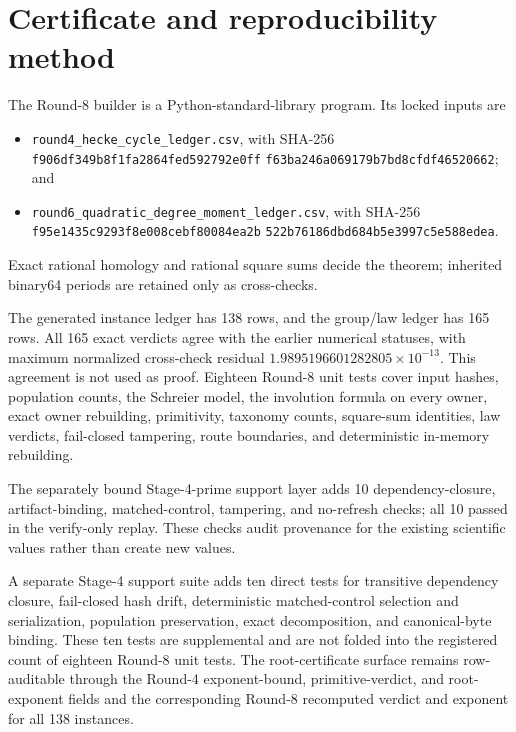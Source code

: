 \documentclass[11pt]{article}
\theoremstyle{definition}
\theoremstyle{remark}
\begin{document}
\section{Certificate and reproducibility method}\label{sec:repro}

The Round-8 builder is a Python-standard-library program. Its locked inputs are
\begin{itemize}
\item \texttt{round4\_hecke\_cycle\_ledger.csv}, with
\newline SHA-256
\texttt{f906df349b8f1fa2864fed592792e0ff}\newline
\texttt{f63ba246a069179b7bd8cfdf46520662}; and
\item \texttt{round6\_quadratic\_degree\_moment\_ledger.csv}, with
\newline SHA-256
\texttt{f95e1435c9293f8e008cebf80084ea2b}\newline
\texttt{522b76186dbd684b5e3997c5e588edea}.
\end{itemize}
Exact rational homology and rational square sums decide the theorem; inherited binary64 periods are retained only as cross-checks.

The generated instance ledger has 138 rows, and the group/law ledger has 165 rows. All 165 exact verdicts agree with the earlier numerical statuses, with maximum normalized cross-check residual $1.9895196601282805\times10^{-13}$. This agreement is not used as proof. Eighteen Round-8 unit tests cover input hashes, population counts, the Schreier model, the involution formula on every owner, exact owner rebuilding, primitivity, taxonomy counts, square-sum identities, law verdicts, fail-closed tampering, route boundaries, and deterministic in-memory rebuilding.

The separately bound Stage-4-prime support layer adds 10 dependency-closure, artifact-binding, matched-control, tampering, and no-refresh checks; all 10 passed in the verify-only replay. These checks audit provenance for the existing scientific values rather than create new values.

A separate Stage-4 support suite adds ten direct tests for transitive dependency closure, fail-closed hash drift, deterministic matched-control selection and serialization, population preservation, exact decomposition, and canonical-byte binding. These ten tests are supplemental and are not folded into the registered count of eighteen Round-8 unit tests. The root-certificate surface remains row-auditable through the Round-4 exponent-bound, primitive-verdict, and root-exponent fields and the corresponding Round-8 recomputed verdict and exponent for all 138 instances.
\end{document}
